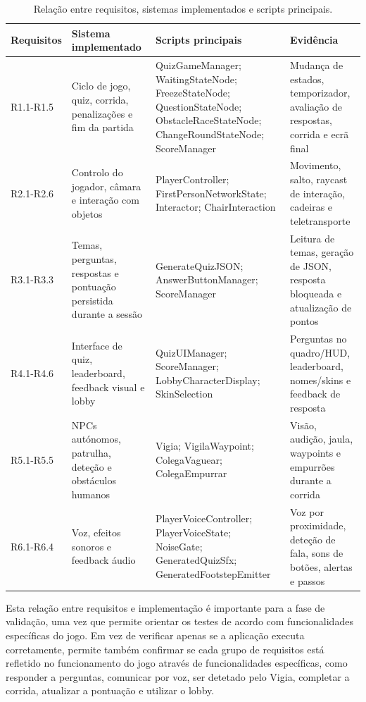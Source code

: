 \begin{table}[htbp]
   \centering
   \caption{Relação entre requisitos, sistemas implementados e scripts principais.}
   \label{tab:reqImpl}
   {
   \scriptsize
   \setlength{\tabcolsep}{4pt}
   \renewcommand{\arraystretch}{1.2}
   \begin{tabular}{|p{1.9cm}|p{3.6cm}|p{5.0cm}|p{3.8cm}|}
      \hline
      \textbf{Requisitos} & \textbf{Sistema implementado} & \textbf{Scripts principais} & \textbf{Evidência}
      \\ \hline
      R1.1-R1.5 & Ciclo de jogo, quiz, corrida, penalizações e fim da partida & QuizGameManager; WaitingStateNode; FreezeStateNode; QuestionStateNode; ObstacleRaceStateNode; ChangeRoundStateNode; ScoreManager & Mudança de estados, temporizador, avaliação de respostas, corrida e ecrã final
      \\ \hline
      R2.1-R2.6 & Controlo do jogador, câmara e interação com objetos & PlayerController; FirstPersonNetworkState; Interactor; ChairInteraction & Movimento, salto, raycast de interação, cadeiras e teletransporte
      \\ \hline
      R3.1-R3.3 & Temas, perguntas, respostas e pontuação persistida durante a sessão & GenerateQuizJSON; AnswerButtonManager; ScoreManager & Leitura de temas, geração de JSON, resposta bloqueada e atualização de pontos
      \\ \hline
      R4.1-R4.6 & Interface de quiz, leaderboard, feedback visual e lobby & QuizUIManager; ScoreManager; LobbyCharacterDisplay; SkinSelection & Perguntas no quadro/HUD, leaderboard, nomes/skins e feedback de resposta
      \\ \hline
      R5.1-R5.5 & NPCs autónomos, patrulha, deteção e obstáculos humanos & Vigia; VigilaWaypoint; ColegaVaguear; ColegaEmpurrar & Visão, audição, jaula, waypoints e empurrões durante a corrida
      \\ \hline
      R6.1-R6.4 & Voz, efeitos sonoros e feedback áudio & PlayerVoiceController; PlayerVoiceState; NoiseGate; GeneratedQuizSfx; GeneratedFootstepEmitter & Voz por proximidade, deteção de fala, sons de botões, alertas e passos
      \\ \hline
   \end{tabular}
   }
\end{table}

Esta relação entre requisitos e implementação é importante para a fase de validação, uma vez que permite orientar os testes de acordo com funcionalidades específicas do jogo. Em vez de verificar apenas se a aplicação executa corretamente, permite também confirmar se cada grupo de requisitos está refletido no funcionamento do jogo através de funcionalidades específicas, como responder a perguntas, comunicar por voz, ser detetado pelo Vigia, completar a corrida, atualizar a pontuação e utilizar o lobby.


